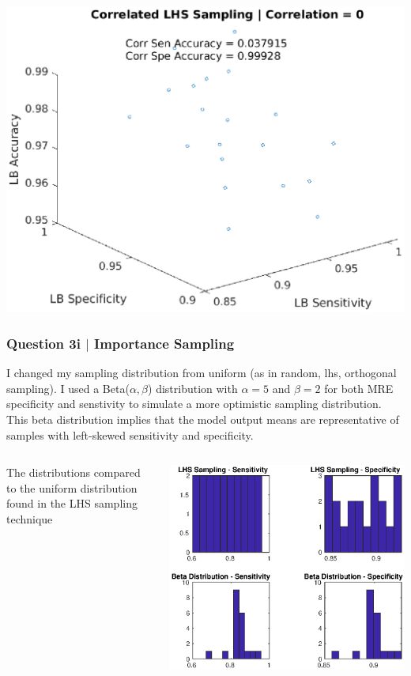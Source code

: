 \documentclass[aspectratio=1610]{beamer}
\begin{document}
\begin{frame}
\includegraphics[scale = .3]{lbcorr6}

\end{frame}


\begin{frame}
\frametitle{Question 3i $|$ Importance Sampling}

I changed my sampling distribution from uniform (as in random, lhs, orthogonal sampling). I used a Beta($\alpha,\beta$) distribution with $\alpha = 5$ and $\beta = 2$ for both MRE specificity and senstivity to simulate a more optimistic sampling distribution. This beta distribution implies that the model output means are representative of samples with left-skewed sensitivity and specificity.

\begin{columns}
\begin{column}{0.45\textwidth}
The distributions compared to the uniform distribution found in the LHS sampling technique
\end{column}
\begin{column}{0.45\textwidth}
\includegraphics[scale = 0.5]{beta_dist} 
\end{column}
\end{columns}
\end{frame}
\end{document}
